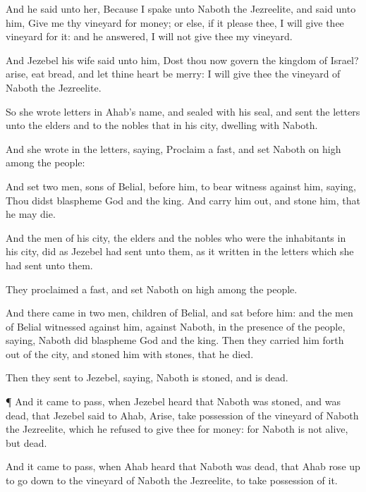 {And he
said unto her, Because I
spake unto
Naboth the
Jezreelite, and
said unto him,
Give me thy
vineyard for
money; or else, if it
please thee, I will
give thee
{}
vineyard for it: and he
answered, I will not
give thee my
vineyard.

And
Jezebel his
wife
said unto him, Dost thou now
govern the
kingdom of
Israel?
arise,
{}
eat
bread, and let thine
heart be
merry: I will
give thee the
vineyard of
Naboth the
Jezreelite.

So she
wrote
letters in
Ahab’s
name, and
sealed
{} with his
seal, and
sent the
letters unto the
elders and to the
nobles that
{} in his
city,
dwelling with
Naboth.

And she
wrote in the
letters,
saying,
Proclaim a
fast, and
set
Naboth on
high among the
people:

And
set
two
men,
sons of
Belial, before him, to bear
witness against him,
saying, Thou didst
blaspheme
God and the
king. And
{} carry him
out, and
stone him, that he may
die.

And the
men of his
city,
{} the
elders and the
nobles who were the
inhabitants in his
city,
did as
Jezebel had
sent unto them,
{} as it
{}
written in the
letters which she had
sent unto them.

They
proclaimed a
fast, and
set
Naboth on
high among the
people.

And there
came in
two
men,
children of
Belial, and
sat before him: and the
men of
Belial
witnessed against him,
{} against
Naboth, in the presence of the
people,
saying,
Naboth did
blaspheme
God and the
king. Then they carried him
forth
out of the
city, and
stoned him with
stones, that he
died.

Then they
sent to
Jezebel,
saying,
Naboth is
stoned, and is
dead.


\par }{\PP {}¶ And it came to pass, when
Jezebel
heard that
Naboth was
stoned, and was
dead, that
Jezebel
said to
Ahab,
Arise, take
possession of the
vineyard of
Naboth the
Jezreelite, which he
refused to
give thee for
money: for
Naboth is not
alive, but
dead.

And it came to pass, when
Ahab
heard that
Naboth was
dead, that
Ahab rose
up to go
down to the
vineyard of
Naboth the
Jezreelite, to take
possession of it.


}
